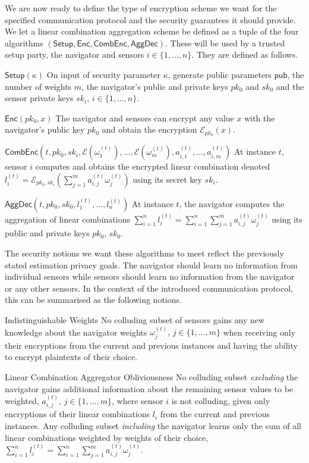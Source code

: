 \documentclass[10pt,letterpaper,oneside,twocolumn,journal]{IEEEtran}
\theoremstyle{definition}
\theoremstyle{definition}
\theoremstyle{remark}
\begin{document}
We are now ready to define the type of encryption scheme we want for the specified communication protocol and the security guarantees it should provide. We let a linear combination aggregation scheme be defined as a tuple of the four algorithms $(\mathsf{Setup}, \mathsf{Enc}, \mathsf{CombEnc}, \mathsf{AggDec})$. These will be used by a trusted setup party, the navigator and sensors $i\in\{1,\dots,n\}$. They are defined as follows.
\begin{LaTeXdescription}
    \item[$\mathsf{Setup}(\kappa)$] On input of security parameter $\kappa$, generate public parameters $\mathsf{pub}$, the number of weights $m$, the navigator's public and private keys $pk_0$ and $sk_0$ and the sensor private keys $sk_i,\,i\in\{1,\dots,n\}$.
    \item[$\mathsf{Enc}(pk_0, x)$] The navigator and sensors can encrypt any value $x$ with the navigator's public key $pk_0$ and obtain the encryption $\mathcal{E}_{pk_0}(x)$.
    \item[$\mathsf{CombEnc}(t, pk_0, sk_i, \mathcal{E}(\omega_1^{(t)}),\dots,\mathcal{E}(\omega_m^{(t)}), a^{(t)}_{i,1},\dots,a^{(t)}_{i,m})$] At instance $t$, sensor $i$ computes and obtains the encrypted linear combination denoted $l^{(t)}_i = \mathcal{E}_{pk_0,sk_i}(\sum^m_{j=1}a^{(t)}_{i,j}\omega^{(t)}_j)$ using its secret key $sk_i$.
    \item[$\mathsf{AggDec}(t, pk_0, sk_0, l^{(t)}_1,\dots,l^{(t)}_n)$] At instance $t$, the navigator computes the aggregation of linear combinations $\sum^{n}_{i=1}l_i^{(t)}=\sum^{n}_{i=1}\sum^{m}_{j=1} a^{(t)}_{i,j}\omega^{(t)}_j$ using its public and private keys $pk_0$, $sk_0$.
\end{LaTeXdescription}
The security notions we want these algorithms to meet reflect the previously stated estimation privacy goals. The navigator should learn no information from individual sensors while sensors should learn no information from the navigator or any other sensors. In the context of the introduced communication protocol, this can be summarised as the following notions.
\begin{LaTeXdescription}
    \item[Indistinguishable Weights] No colluding subset of sensors gains any new knowledge about the navigator weights $\omega^{(t)}_j,\,j\in\{1,\dots,m\}$ when receiving only their encryptions from the current and previous instances and having the ability to encrypt plaintexts of their choice.
    \item[Linear Combination Aggregator Obliviousness] No colluding subset \textit{excluding} the navigator gains additional information about the remaining sensor values to be weighted, $a^{(t)}_{i,j},\,j\in\{1,\dots,m\}$, where sensor $i$ is not colluding, given only encryptions of their linear combinations $l_i$ from the current and previous instances. Any colluding subset \textit{including} the navigator learns only the sum of all linear combinations weighted by weights of their choice, $\sum^{n}_{i=1}l_i^{(t)}=\sum^{n}_{i=1}\sum^{m}_{j=1} a^{(t)}_{i,j}\omega^{(t)}_j$.
\end{LaTeXdescription}
\end{document}
